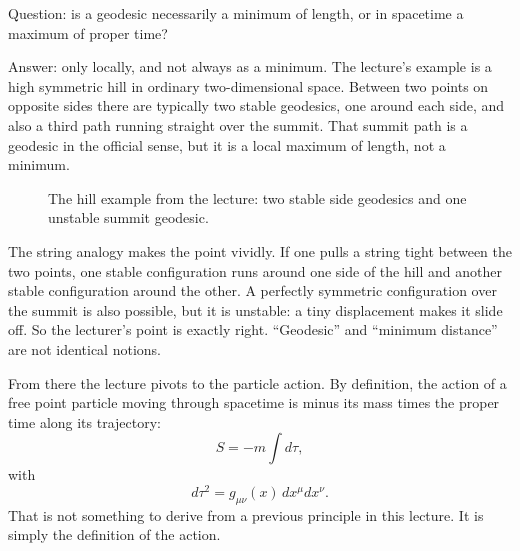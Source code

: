 Question: is a geodesic necessarily a minimum of length, or in spacetime a maximum of proper time?

Answer: only locally, and not always as a minimum. The lecture's example is a high symmetric hill in ordinary two-dimensional space. Between two points on opposite sides there are typically two stable geodesics, one around each side, and also a third path running straight over the summit. That summit path is a geodesic in the official sense, but it is a local maximum of length, not a minimum.

\begin{figure}[t]
\centering
{}
\caption{The hill example from the lecture: two stable side geodesics and one unstable summit geodesic.}
\end{figure}

The string analogy makes the point vividly. If one pulls a string tight between the two points, one stable configuration runs around one side of the hill and another stable configuration around the other. A perfectly symmetric configuration over the summit is also possible, but it is unstable: a tiny displacement makes it slide off. So the lecturer's point is exactly right. ``Geodesic'' and ``minimum distance'' are not identical notions.

From there the lecture pivots to the particle action. By definition, the action of a free point particle moving through spacetime is minus its mass times the proper time along its trajectory:
\begin{equation}
S=-m\int d\tau,
\end{equation}
with
\begin{equation}
d\tau^2=g_{\mu\nu}(x)\,dx^\mu dx^\nu.
\end{equation}
That is not something to derive from a previous principle in this lecture. It is simply the definition of the action.

